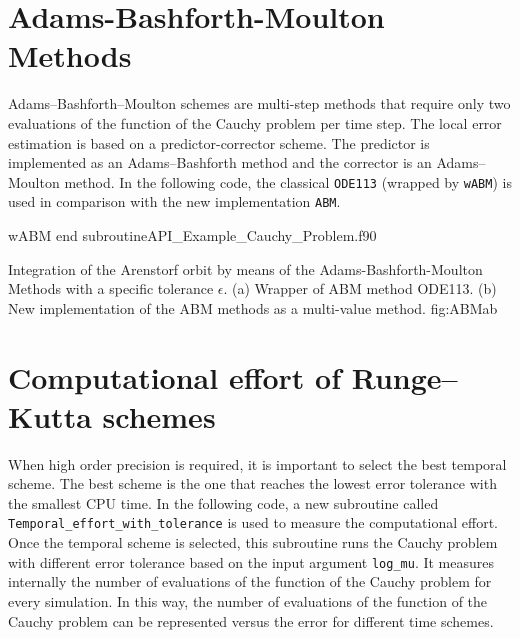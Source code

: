   
  
  
 \newpage                                   
 \section{Adams-Bashforth-Moulton Methods}
  Adams--Bashforth--Moulton schemes are multi-step methods that require only two evaluations of the function of the Cauchy problem per time step. The local error estimation is based on a predictor-corrector scheme. The predictor is implemented as an Adams--Bashforth method and the corrector is an Adams--Moulton method.  
  In the following code, the classical \verb|ODE113| (wrapped by  \verb|wABM|) is used in  comparison with the new implementation   \verb|ABM|.       
 
       \vspace{0.5cm} 
                {wABM}
                {end  subroutine}{API_Example_Cauchy_Problem.f90}   
         
         
                              
     \twographs{}
               {}
               {Integration of the Arenstorf orbit by means of the Adams-Bashforth-Moulton Methods with a specific tolerance $\epsilon$.
                                                (a) Wrapper of ABM method ODE113.
                                                (b) New implementation of the ABM methods as a multi-value method. }
                                                {fig:ABMab}     
                               
    
               
 
   
 \newpage                            
 \section{Computational effort of Runge--Kutta schemes}
 When high order precision is required, it is important to select the best temporal scheme. The best scheme is the one that reaches the lowest error tolerance with the smallest CPU time. 
In the following code, a new subroutine called  \verb|Temporal_effort_with_tolerance| is used to measure the computational effort. Once the temporal scheme is selected, this subroutine runs the  Cauchy problem with different error tolerance based on the input argument  \verb|log_mu|.  It measures internally the number of evaluations of the function of the Cauchy problem for every simulation. In this way, the number of evaluations of the function of the Cauchy problem can be represented versus the error for different time schemes. 

